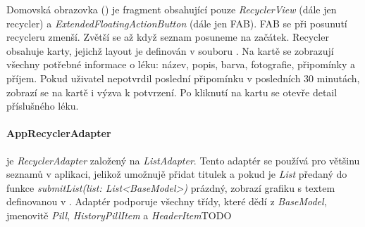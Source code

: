 \documentclass[../TakeYourPill.tex]{subfiles}
\begin{document}
Domovská obrazovka () je fragment obsahující pouze \textit{RecyclerView} (dále jen recycler) a \textit{ExtendedFloatingActionButton} (dále jen FAB). FAB se při posunutí recycleru zmenší. Zvětší se až když seznam posuneme na začátek. Recycler obsahuje karty, jejichž layout je definován v souboru . Na kartě se zobrazují všechny potřebné informace o léku: název, popis, barva, fotografie, připomínky a příjem. Pokud uživatel nepotvrdil poslední připomínku v posledních 30 minutách, zobrazí se na kartě i výzva k potvrzení. Po kliknutí na kartu se otevře detail příslušného léku.

\paragraph{AppRecyclerAdapter} je \textit{RecyclerAdapter} založený na \textit{ListAdapter}. Tento adaptér se používá pro většinu seznamů v aplikaci, jelikož umožnujě přidat titulek a pokud je \textit{List} předaný do funkce \textit{submitList(list: List<BaseModel>)} prázdný, zobrazí grafiku s textem definovanou v . Adaptér podporuje všechny třídy, které dědí z \textit{BaseModel}, jmenovitě \textit{Pill}, \textit{HistoryPillItem} a \textit{HeaderItem}TODO
\end{document}
